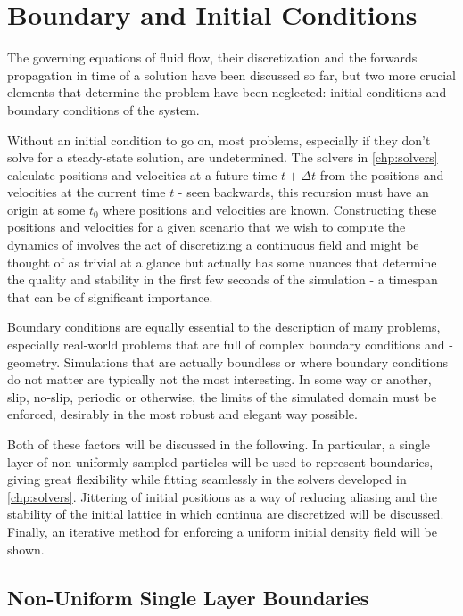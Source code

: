 
\chapter{Boundary and Initial Conditions}\label{chp:boundary-and-initial}
The governing equations of fluid flow, their discretization and the forwards propagation in time of a solution have been discussed so far, but two more crucial elements that determine the problem have been neglected: initial conditions and boundary conditions of the system.

Without an initial condition to go on, most problems, especially if they don't solve for a steady-state solution, are undetermined. The solvers in \autoref{chp:solvers} calculate positions and velocities at a future time $t+\Delta t$ from the positions and velocities at the current time $t$ - seen backwards, this recursion must have an origin at some $t_0$ where positions and velocities are known. Constructing these positions and velocities for a given scenario that we wish to compute the dynamics of involves the act of discretizing a continuous field and might be thought of as trivial at a glance but actually has some nuances that determine the quality and stability in the first few seconds of the simulation - a timespan that can be of significant importance.

Boundary conditions are equally essential to the description of many problems, especially real-world problems that are full of complex boundary conditions and -geometry. Simulations that are actually boundless or where boundary conditions do not matter are typically not the most interesting. In some way or another, slip, no-slip, periodic or otherwise, the limits of the simulated domain must be enforced, desirably in the most robust and elegant way possible.

Both of these factors will be discussed in the following. In particular, a single layer of non-uniformly sampled particles will be used to represent boundaries, giving great flexibility while fitting seamlessly in the solvers developed in \ref*{chp:solvers}. Jittering of initial positions as a way of reducing aliasing and the stability of the initial lattice in which continua are discretized will be discussed. Finally, an iterative method for enforcing a uniform initial density field will be shown.

\section{Non-Uniform Single Layer Boundaries}

